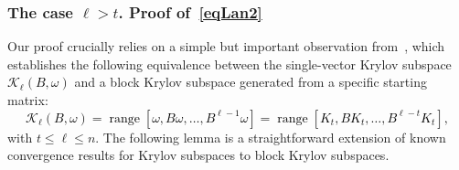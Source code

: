 \documentclass{siamart190516}
\newcommand{\range}{\mathop\mathrm{range}}
\newcommand{\edit}[1]{\textcolor{black}{#1}} %
\begin{document}
\subsubsection{The case $\ell > t$. Proof of~\cref{eqLan2}}
\label{thmLan2}
Our proof crucially relies on a simple but important observation from~\cite[(1.3)]{Meyer2023}, which establishes the following equivalence between the single-vector Krylov subspace \edit{$\mathcal{K}_{\ell}(B,\omega)$} and a block Krylov subspace generated from a specific starting matrix:
\edit{
\begin{equation}
    \label{connectionLanczos}
    \mathcal{K}_{\ell}(B,\omega) = \range[\omega,B\omega,\dotsc,B^{\ell-1}\omega] = \range[K_{t},BK_{t},\dotsc,B^{\ell-t}K_{t}],
\end{equation}}
with $t\leq \ell\leq n$.  The following lemma is a straightforward extension of known convergence results for Krylov subspaces to block Krylov subspaces.
\end{document}
